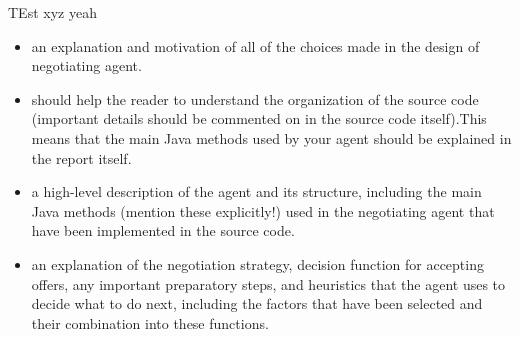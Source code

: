 TEst xyz yeah

\begin{itemize}
\item an explanation and motivation of all of the choices made in the design of negotiating agent.
\item should help the reader to understand the organization of the source code (important details should be commented on in the source code itself).This means that the main Java methods used by your agent should
be explained in the report itself.
\item a high-level description of the agent and its structure, including the main Java methods (mention these explicitly!) used in the negotiating agent that have been implemented in the source code.
\item an explanation of the negotiation strategy, decision function for accepting offers, any important preparatory steps, and heuristics that the agent uses to decide what to do next, including the factors that have been selected and their combination into these functions.
\end{itemize}